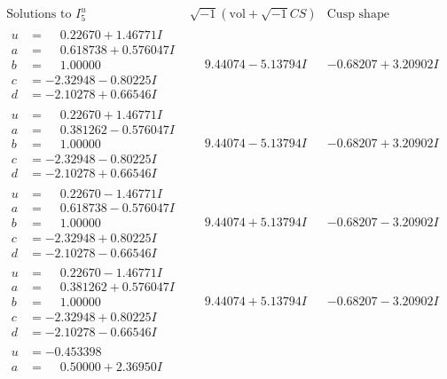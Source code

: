 \documentclass[1p]{elsarticle_modified}
\theoremstyle{definition}
\newcommand{\I}{\sqrt{-1}}
\begin{document}
$$\begin{array}{c|c|c}  
\text{Solutions to }I^u_{5}& \I (\text{vol} + \sqrt{-1}CS) & \text{Cusp shape}\\
 \hline 
\begin{aligned}
u &= \phantom{-}0.22670 + 1.46771 I \\
a &= \phantom{-}0.618738 + 0.576047 I \\
b &= \phantom{-}1.00000\phantom{ +0.000000I} \\
c &= -2.32948 - 0.80225 I \\
d &= -2.10278 + 0.66546 I\end{aligned}
 & \phantom{-}9.44074 - 5.13794 I & -0.68207 + 3.20902 I \\ \hline\begin{aligned}
u &= \phantom{-}0.22670 + 1.46771 I \\
a &= \phantom{-}0.381262 - 0.576047 I \\
b &= \phantom{-}1.00000\phantom{ +0.000000I} \\
c &= -2.32948 - 0.80225 I \\
d &= -2.10278 + 0.66546 I\end{aligned}
 & \phantom{-}9.44074 - 5.13794 I & -0.68207 + 3.20902 I \\ \hline\begin{aligned}
u &= \phantom{-}0.22670 - 1.46771 I \\
a &= \phantom{-}0.618738 - 0.576047 I \\
b &= \phantom{-}1.00000\phantom{ +0.000000I} \\
c &= -2.32948 + 0.80225 I \\
d &= -2.10278 - 0.66546 I\end{aligned}
 & \phantom{-}9.44074 + 5.13794 I & -0.68207 - 3.20902 I \\ \hline\begin{aligned}
u &= \phantom{-}0.22670 - 1.46771 I \\
a &= \phantom{-}0.381262 + 0.576047 I \\
b &= \phantom{-}1.00000\phantom{ +0.000000I} \\
c &= -2.32948 + 0.80225 I \\
d &= -2.10278 - 0.66546 I\end{aligned}
 & \phantom{-}9.44074 + 5.13794 I & -0.68207 - 3.20902 I \\ \hline\begin{aligned}
u &= -0.453398\phantom{ +0.000000I} \\
a &= \phantom{-}0.50000 + 2.36950 I \\

\end{aligned}
\end{array}$$
\end{document}

